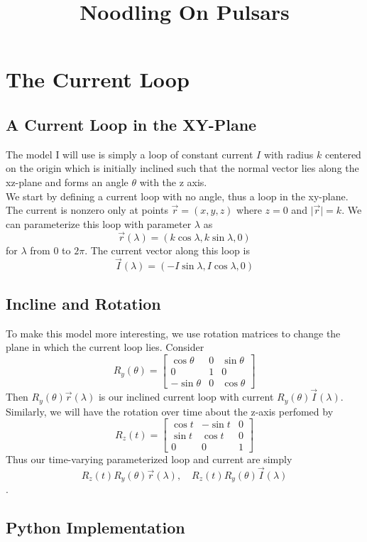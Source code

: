 \documentclass[10pt,a4paper]{article}
\title{Noodling On Pulsars}
\begin{document}
\maketitle
\section{The Current Loop}
\subsection{A Current Loop in the XY-Plane}
The model I will use is simply a loop of constant current $I$ with radius $k$ centered on the origin which is initially inclined such that the normal vector lies along the xz-plane and forms an angle $\theta$ with the z axis.\\
We start by defining a current loop with no angle, thus a loop in the xy-plane. The current is nonzero only at points $\vec{r}=(x,y,z)$ where $z=0$ and $\vert \vec{r} \vert = k$. We can parameterize this loop with parameter $\lambda$ as $$\vec{r}(\lambda)=(k\cos{\lambda}, k\sin{\lambda}, 0)$$ for $\lambda$ from $0$ to $2\pi$. The current vector along this loop is $$\vec{I}(\lambda)=(-I\sin{\lambda}, I\cos{\lambda}, 0)$$
\subsection{Incline and Rotation}
To make this model more interesting, we use rotation matrices to change the plane in which the current loop lies. Consider
$$\bm{\mathit{R}}_y(\theta)=\begin{bmatrix}
\cos{\theta} & 0 & \sin{\theta} \\
0 & 1 & 0 \\
-\sin{\theta} & 0 & \cos{\theta}
\end{bmatrix}$$
Then $\bm{\mathit{R}}_y(\theta)\vec{r}(\lambda)$ is our inclined current loop with current $\bm{\mathit{R}}_y(\theta)\vec{I}(\lambda)$.\\
Similarly, we will have the rotation over time about the z-axis perfomed by
$$\bm{\mathit{R}}_z(t)=\begin{bmatrix}
\cos{t} & -\sin{t} & 0 \\
\sin{t} & \cos{t} & 0 \\
0 & 0 & 1
\end{bmatrix}$$
Thus our time-varying parameterized loop and current are simply
$$\bm{\mathit{R}}_z(t)\bm{\mathit{R}}_y(\theta)\vec{r}(\lambda), \quad \bm{\mathit{R}}_z(t)\bm{\mathit{R}}_y(\theta)\vec{I}(\lambda)$$.
\subsection{Python Implementation}
\end{document}
